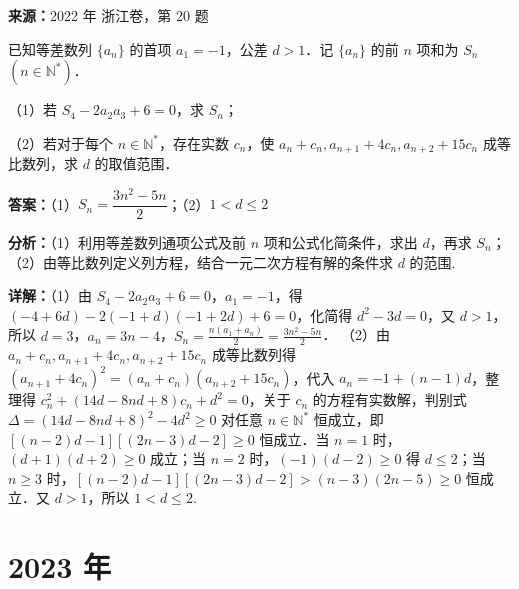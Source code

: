 \begin{question}[points=15]
\textbf{来源：}2022 年 浙江卷，第 20 题\par
已知等差数列 $\{a_n\}$ 的首项 $a_1 = -1$，公差 $d > 1$．记 $\{a_n\}$ 的前 $n$ 项和为 $S_n$ $(n \in \mathbb{N}^*)$．

（1）若 $S_4 - 2a_2 a_3 + 6 = 0$，求 $S_n$；

（2）若对于每个 $n \in \mathbb{N}^*$，存在实数 $c_n$，使 $a_n + c_n, a_{n+1} + 4c_n, a_{n+2} + 15c_n$ 成等比数列，求 $d$ 的取值范围．
\begin{solution}
\textbf{答案：}（1）$S_n = \dfrac{3n^2-5n}{2}$；（2）$1<d\le 2$

\textbf{分析：}（1）利用等差数列通项公式及前 $n$ 项和公式化简条件，求出 $d$，再求 $S_n$；（2）由等比数列定义列方程，结合一元二次方程有解的条件求 $d$ 的范围.

\textbf{详解：}（1）由 $S_4 - 2a_2a_3+6=0$，$a_1=-1$，得 $(-4+6d) - 2(-1+d)(-1+2d)+6=0$，化简得 $d^2-3d=0$，又 $d>1$，所以 $d=3$，$a_n=3n-4$，$S_n = \frac{n(a_1+a_n)}{2} = \frac{3n^2-5n}{2}$．
（2）由 $a_n+c_n, a_{n+1}+4c_n, a_{n+2}+15c_n$ 成等比数列得 $(a_{n+1}+4c_n)^2 = (a_n+c_n)(a_{n+2}+15c_n)$，代入 $a_n=-1+(n-1)d$，整理得 $c_n^2 + (14d-8nd+8)c_n + d^2 = 0$，关于 $c_n$ 的方程有实数解，判别式 $\Delta = (14d-8nd+8)^2 - 4d^2 \ge 0$ 对任意 $n\in\mathbb{N}^*$ 恒成立，即 $[(n-2)d-1][(2n-3)d-2] \ge 0$ 恒成立．当 $n=1$ 时，$(d+1)(d+2)\ge0$ 成立；当 $n=2$ 时，$(-1)(d-2)\ge0$ 得 $d\le2$；当 $n\ge3$ 时，$[(n-2)d-1][(2n-3)d-2] > (n-3)(2n-5) \ge 0$ 恒成立．又 $d>1$，所以 $1<d\le2$.
\end{solution}
\end{question}

\section*{2023 年}

